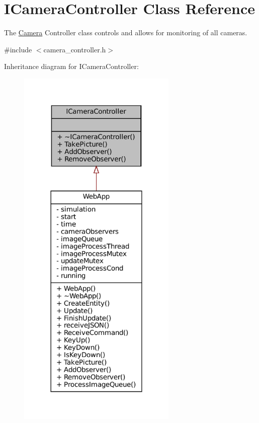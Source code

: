 \hypertarget{classICameraController}{}\section{I\+Camera\+Controller Class Reference}
\label{classICameraController}


The \hyperlink{classCamera}{Camera} Controller class controls and allows for monitoring of all cameras.  




{\ttfamily \#include $<$camera\+\_\+controller.\+h$>$}



Inheritance diagram for I\+Camera\+Controller\+:\nopagebreak
\begin{figure}[H]
\begin{center}
\leavevmode
\includegraphics[width=215pt]{classICameraController__inherit__graph}
\end{center}
\end{figure}


